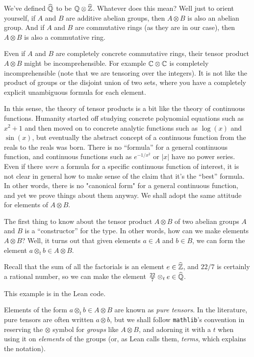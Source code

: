 We've defined $\widehat{\mathbb{Q}}$ to be $\mathbb{Q}\otimes\widehat{\mathbb{Z}}$. Whatever does this mean? Well just to orient yourself,
if $A$ and $B$ are additive abelian groups, then $A\otimes B$ is also an abelian group.
And if $A$ and $B$ are commutative rings (as they are in our case), then $A\otimes B$ is also
a commutative ring.

Even if $A$ and $B$ are completely concrete commutative rings, their tensor product $A\otimes B$
might be incomprehensible. For example $\mathbb{C}\otimes\mathbb{C}$ is completely incomprehensible (note that we are
tensoring over the integers). It is not like the product of groups or the disjoint union of
two sets, where you have a completely explicit unambiguous formula for each element.

In this sense, the theory of tensor products is a bit like the theory of continuous functions.
Humanity started off studying concrete polynomial equations such as $x^2+1$ and then moved on to
concrete analytic functions such as $\log(x)$ and $\sin(x)$, but eventually the abstract concept
of a continuous function from the reals to the reals was born. There is no ``formula'' for a general
continuous function, and continuous functions such as $e^{-1/x^2}$ or $|x|$ have no power series.
Even if there \emph{were} a formula for a specific continuous function of interest, it is not clear
in general how to make sense of the claim that it's the ``best'' formula. In other words, there is
no "canonical form" for a general continuous function, and yet we prove things about them anyway.
We shall adopt the same attitude for elements of $A\otimes B$.

The first thing to know about the tensor product $A\otimes B$ of two abelian groups $A$ and $B$
is a ``constructor'' for the type. In other words, how can we make elements $A\otimes B$?
Well, it turns out that given elements $a\in A$ and $b\in B$, we can form the element
$a\otimes_t b\in A\otimes B$.

\begin{example} Recall that the sum of all the factorials is an element $e\in\widehat{\mathbb{Z}}$, and $22/7$ is certainly
a rational number, so we can make the element $\frac{22}{7}\otimes_te\in\widehat{\mathbb{Q}}$.
\end{example}

This example is in the Lean code.

Elements of the form $a\otimes_t b\in A\otimes B$ are known as \emph{pure tensors}. In the
literature, pure tensors
are often written $a\otimes b$, but we shall follow {\tt mathlib}'s convention in reserving
the $\otimes$ symbol for \emph{groups} like $A \otimes B$, and adorning it with a $t$ when
using it on \emph{elements} of the groups (or, as Lean calls them, \emph{terms}, which explains
the notation).

